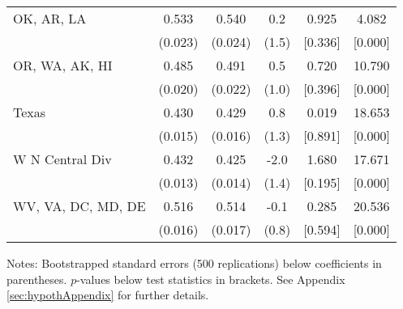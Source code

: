 \begin{landscape}
\begin{table}[ht]
{\begin{threeparttable}
\begin{tabular}{lccccc}
OK, AR, LA & 0.533 & 0.540 & 0.2 & 0.925 & 4.082 \\ 
 & (0.023) & (0.024) & (1.5) & [0.336] & [0.000] \\ 
OR, WA, AK, HI & 0.485 & 0.491 & 0.5 & 0.720 & 10.790 \\ 
 & (0.020) & (0.022) & (1.0) & [0.396] & [0.000] \\ 
Texas & 0.430 & 0.429 & 0.8 & 0.019 & 18.653 \\ 
 & (0.015) & (0.016) & (1.3) & [0.891] & [0.000] \\ 
W N Central Div & 0.432 & 0.425 & -2.0 & 1.680 & 17.671 \\ 
 & (0.013) & (0.014) & (1.4) & [0.195] & [0.000] \\ 
WV, VA, DC, MD, DE & 0.516 & 0.514 & -0.1 & 0.285 & 20.536 \\ 
 & (0.016) & (0.017) & (0.8) & [0.594] & [0.000] \\ 
\bottomrule
\end{tabular}
{\footnotesize {\raggedright Notes: Bootstrapped standard errors (500 replications) below coefficients in parentheses. $p$-values below test statistics in brackets. See Appendix \ref{sec:hypothAppendix} for further details.}}
\end{threeparttable}
}
\end{table}
\end{landscape}

